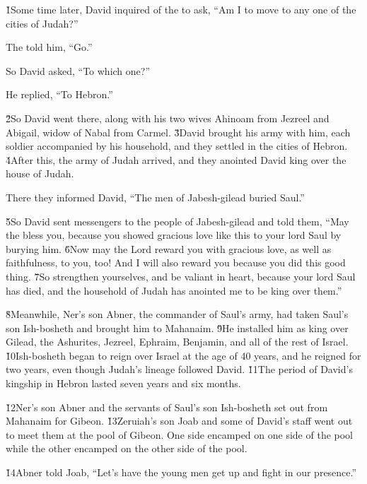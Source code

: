\v{1}Some time later, David inquired of the  to ask, ``Am I to move to any one of the cities of Judah?''

The  told him, ``Go.''

So David asked, ``To which one?''

He replied, ``To Hebron.''

\v{2}So David went there, along with his two wives Ahinoam from Jezreel and Abigail, widow of Nabal from Carmel. \v{3}David brought his army with him, each soldier accompanied by his household, and they settled in the cities of Hebron. \v{4}After this, the army of Judah arrived, and they anointed David king over the house of Judah.

There they informed David, ``The men of Jabesh-gilead buried Saul.''

\v{5}So David sent messengers to the people of Jabesh-gilead and told them, ``May the  bless you, because you showed gracious love like this to your lord Saul by burying him. \v{6}Now may the Lord reward you with gracious love, as well as faithfulness, to you, too! And I will also reward you because you did this good thing. \v{7}So strengthen yourselves, and be valiant in heart, because your lord Saul has died, and the household of Judah has anointed me to be king over them.''

\v{8}Meanwhile, Ner's son Abner, the commander of Saul's army, had taken Saul's son Ish-bosheth and brought him to Mahanaim. \v{9}He installed him as king over Gilead, the Ashurites, Jezreel, Ephraim, Benjamin, and all of the rest of Israel. \v{10}Ish-bosheth began to reign over Israel at the age of 40 years, and he reigned for two years, even though Judah's lineage followed David. \v{11}The period of David's kingship in Hebron lasted seven years and six months.

\v{12}Ner's son Abner and the servants of Saul's son Ish-bosheth set out from Mahanaim for Gibeon. \v{13}Zeruiah's son Joab and some of David's staff went out to meet them at the pool of Gibeon. One side encamped on one side of the pool while the other encamped on the other side of the pool.

\v{14}Abner told Joab, ``Let's have the young men get up and fight in our presence.''

